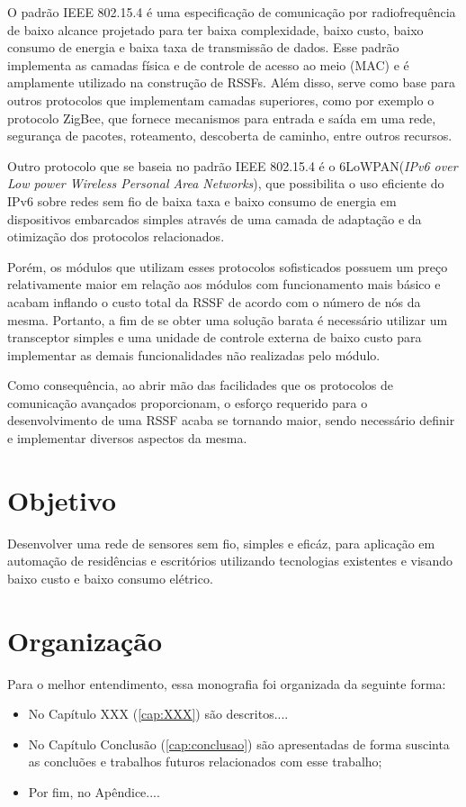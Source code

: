 O padrão IEEE 802.15.4 é uma especificação de comunicação por radiofrequência de baixo alcance projetado para
ter baixa complexidade, baixo custo, baixo consumo de energia e baixa taxa de transmissão de dados. Esse
padrão implementa as camadas física e de controle de acesso ao meio (MAC) e é amplamente utilizado na construção de
RSSFs. Além disso, serve como base para outros protocolos que implementam camadas superiores, como por exemplo
o protocolo ZigBee, que fornece mecanismos para entrada e saída em uma rede, segurança de pacotes, roteamento,
descoberta de caminho, entre outros recursos. \cite{buratti2011}

Outro protocolo que se baseia no padrão IEEE 802.15.4 é o 6LoWPAN(\textit{IPv6 over Low power Wireless
Personal Area Networks}), que possibilita o uso eficiente do IPv6 sobre redes sem fio de baixa taxa e baixo
consumo de energia em dispositivos embarcados simples através de uma camada de adaptação e da otimização dos
protocolos relacionados. \cite{shelby_bormann2009}

Porém, os módulos que utilizam esses protocolos sofisticados possuem um preço relativamente maior em relação
aos módulos com funcionamento mais básico e acabam inflando o custo total da RSSF de acordo com o número de
nós da mesma. Portanto, a fim de se obter uma solução barata é necessário utilizar um transceptor simples e
uma unidade de controle externa de baixo custo para implementar as demais funcionalidades não realizadas pelo
módulo.

Como consequência, ao abrir mão das facilidades que os protocolos de comunicação avançados proporcionam, o
esforço requerido para o desenvolvimento de uma RSSF acaba se tornando maior, sendo necessário definir e
implementar diversos aspectos da mesma.

\section {Objetivo}
Desenvolver uma rede de sensores sem fio, simples e eficáz, para aplicação em automação de residências e
escritórios utilizando tecnologias existentes e visando baixo custo e baixo consumo elétrico.

\section {Organização}
Para o melhor entendimento, essa monografia foi organizada da seguinte forma:

\begin{itemize} \item No Capítulo XXX (\ref{cap:XXX}) são descritos....

\item No Capítulo Conclusão (\ref{cap:conclusao}) são apresentadas de forma suscinta as concluões e trabalhos
futuros relacionados com esse trabalho;

\item Por fim, no Apêndice....  \end{itemize}
